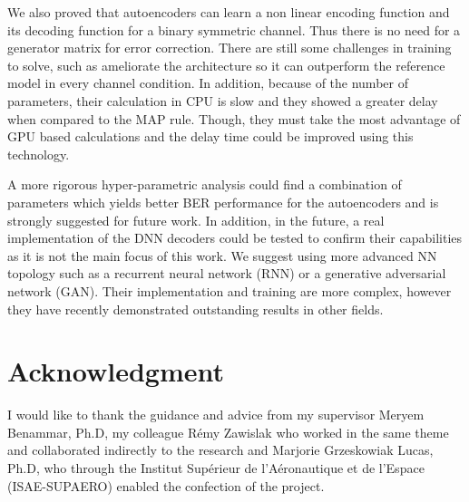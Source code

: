 \documentclass[conference]{IEEEtran}
\begin{document}
We also proved that autoencoders can learn a non linear encoding function and its decoding function for a binary symmetric channel. Thus there is no need for a generator matrix for error correction. There are still some challenges in training to solve, such as ameliorate the architecture so it can outperform the reference model in every channel condition. In addition, because of the number of parameters, their calculation in CPU is slow and they showed a greater delay when compared to the MAP rule. Though, they must take the most advantage of GPU based calculations and the delay time could be improved using this technology.

A more rigorous hyper-parametric analysis could find a combination of parameters which yields better BER performance for the autoencoders and is strongly suggested for future work. In addition, in the future, a real implementation of the DNN decoders could be tested to confirm their capabilities as it is not the main focus of this work. We suggest using more advanced NN topology such as a recurrent neural network (RNN) or a generative adversarial network (GAN). Their implementation and training are more complex, however they have recently demonstrated outstanding results in other fields.



\section*{Acknowledgment}

I would like to thank the guidance and advice from my supervisor Meryem Benammar, Ph.D, my colleague Rémy Zawislak who worked in the same theme and collaborated indirectly to the research and Marjorie Grzeskowiak Lucas, Ph.D, who through the Institut Supérieur de l'Aéronautique et de l'Espace (ISAE-SUPAERO) enabled the confection of the project.


\end{document}
